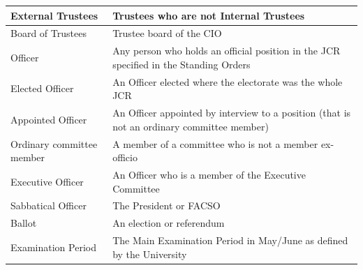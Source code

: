 \documentclass[12pt]{article}
\begin{document}
\begin{enumerate}
\begin{tabular}{|p{1.5in}|p{3.8in}|}
    External Trustees		& Trustees who are not Internal Trustees\\\hline
    Board of Trustees		& Trustee board of the CIO\\\hline
    Officer                 & Any person who holds an official position in the JCR specified in the Standing Orders\\ \hline
    Elected Officer         & An Officer elected where the electorate was the whole JCR \\ \hline
    Appointed Officer       & An Officer appointed by interview to a position (that is not an ordinary committee member) \\ \hline
    Ordinary committee member & A member of a committee who is not a member ex-officio \\ \hline
    Executive Officer       & An Officer who is a member of the Executive Committee \\ \hline
    Sabbatical Officer		& The President or FACSO\\\hline
    Ballot                  & An election or referendum \\ \hline
    Examination Period      & The Main Examination Period in May/June as defined by the University\\\hline
\end{tabular}
\end{enumerate}
\end{document}
